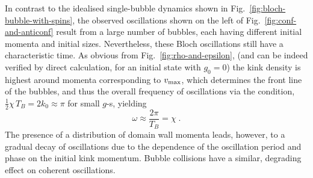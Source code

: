 \documentclass[amsmath,amssymb,11pt]{article}
\numberwithin{equation}{section}
\numberwithin{figure}{section}
\numberwithin{table}{section}
\begin{document}
In contrast to the idealised single-bubble dynamics shown in Fig.~\ref{fig:bloch-bubble-with-spins}, the observed oscillations shown on the left of Fig.~\ref{fig:conf-and-anticonf} result from a large number of bubbles, each having  different initial momenta and initial sizes.  Nevertheless, these Bloch oscillations still have a characteristic time. As obvious from Fig.~\ref{fig:rho-and-epsilon}, (and can be indeed verified by direct calculation, for an initial state with $g_0=0$) the kink density is highest around momenta corresponding to $v_{\rm \max}$, which determines the front line of the bubbles, and thus the overall 
frequency of oscillations via the condition, $\frac 1 2 \chi \,T_B = 2 k_0 \approx \pi$ for small $g$-s, yielding 
$$
\omega \approx \frac{2 \pi} {T_B} = \chi\;.   
$$
The presence of a distribution of domain wall {momenta}  leads, however, to a 
gradual decay of oscillations  due to the dependence of the oscillation period and phase on the initial kink momentum. Bubble collisions have a similar, degrading effect on coherent oscillations.
\end{document}
